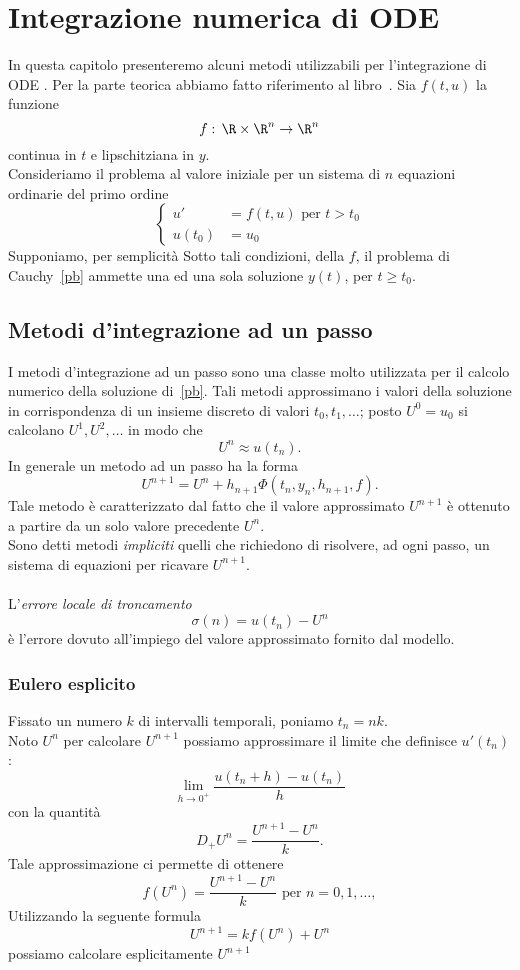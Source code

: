\chapter{Integrazione numerica di ODE}
In questa capitolo presenteremo alcuni  metodi utilizzabili per l'integrazione  di ODE .  Per la parte teorica abbiamo fatto riferimento al libro~\cite{LeVeque}. 
Sia $f(t,u)$ la funzione
$$ f:\, \R \times \R^n \to \R^n$$
continua in $t$ e lipschitziana in $y$.\\
Consideriamo il problema al valore iniziale per un sistema di $n$ equazioni ordinarie del primo ordine
$$ \label{pb}\begin{cases} u'&= f(t,u) \text{ per } t>t_0\\
 u(t_0) &= u_0	
 \end{cases}$$ 
Supponiamo, per semplicit\`a 
 Sotto tali condizioni, della $f$, il problema di Cauchy~\eqref{pb} ammette una ed una sola soluzione $y(t)$, per $t\geq t_0$. 
 \section{Metodi d'integrazione ad un passo}
I metodi d'integrazione ad un passo sono una  classe  molto utilizzata per il calcolo numerico della soluzione di~\eqref{pb}. Tali metodi approssimano i valori della soluzione in corrispondenza di un insieme discreto di valori $t_0, t_1, \dots$; posto  $U^0 = u_0$  si calcolano $U^1, U^2, \dots$  in modo che $$U^n \approx u\left(t_n\right).$$ 
In generale un metodo ad un passo ha la forma
 $$ U^{n+1} = U^n   + h_{n+1} \Phi\left( t_n, y_n ,  h_{n+1},f\right).$$
Tale metodo \`e caratterizzato dal fatto che il valore approssimato $U^{n+1}$ \`e ottenuto a partire da un solo valore precedente $U^n$.\\
Sono detti metodi \textit{impliciti} quelli che richiedono di risolvere, ad ogni passo,  un sistema di equazioni per ricavare $U^{n+1}$.\\ \\
L'\textit{errore locale di troncamento}  
$$ \sigma(n) = u(t_n) -U^n $$ 
\`e l'errore dovuto all'impiego del valore approssimato fornito dal modello.  

 \subsection{Eulero esplicito}
Fissato un numero $k$ di intervalli temporali, poniamo 
$t_n = nk$.\\ 
Noto $U^n$ per calcolare $U^{n+1}$ possiamo approssimare  il limite che definisce $u'\left(t_n\right)$:
$$ \lim_{h\to 0^+} \frac{u\left(t_n + h\right) - u\left(t_n\right)}{h}$$ 
con la quantit\`a 
$$ D_+ U^n = \frac{U^{n+1}-U^n}{k}.$$
Tale approssimazione ci permette di ottenere
$$ f\left(U^n\right) = \frac{U^{n+1}-U^n}{k} \text{ per } n=0, 1, \dots, $$
Utilizzando la seguente formula
$$ U^{n+1} = k f\left(U^n\right) + U^n$$
possiamo calcolare esplicitamente $U^{n+1}$
